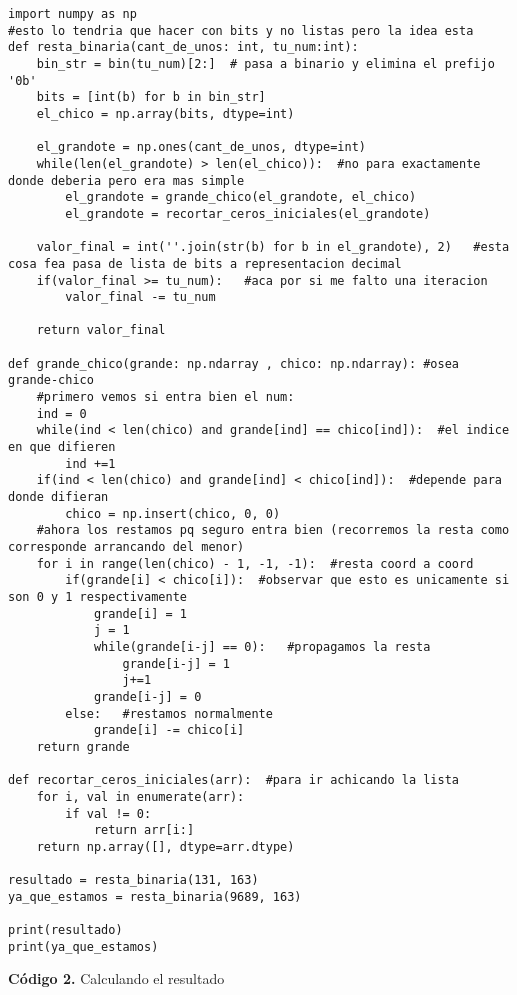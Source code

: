 \documentclass[12pt]{amsart}
\theoremstyle{plain}
\begin{document}
\begin{lstlisting}
import numpy as np
#esto lo tendria que hacer con bits y no listas pero la idea esta
def resta_binaria(cant_de_unos: int, tu_num:int):
    bin_str = bin(tu_num)[2:]  # pasa a binario y elimina el prefijo '0b'
    bits = [int(b) for b in bin_str]
    el_chico = np.array(bits, dtype=int)

    el_grandote = np.ones(cant_de_unos, dtype=int)
    while(len(el_grandote) > len(el_chico)):  #no para exactamente donde deberia pero era mas simple
        el_grandote = grande_chico(el_grandote, el_chico)
        el_grandote = recortar_ceros_iniciales(el_grandote)
        
    valor_final = int(''.join(str(b) for b in el_grandote), 2)   #esta cosa fea pasa de lista de bits a representacion decimal
    if(valor_final >= tu_num):   #aca por si me falto una iteracion
        valor_final -= tu_num
        
    return valor_final

def grande_chico(grande: np.ndarray , chico: np.ndarray): #osea grande-chico
    #primero vemos si entra bien el num:
    ind = 0
    while(ind < len(chico) and grande[ind] == chico[ind]):  #el indice en que difieren
        ind +=1
    if(ind < len(chico) and grande[ind] < chico[ind]):  #depende para donde difieran
        chico = np.insert(chico, 0, 0)
    #ahora los restamos pq seguro entra bien (recorremos la resta como corresponde arrancando del menor)
    for i in range(len(chico) - 1, -1, -1):  #resta coord a coord
        if(grande[i] < chico[i]):  #observar que esto es unicamente si son 0 y 1 respectivamente
            grande[i] = 1
            j = 1
            while(grande[i-j] == 0):   #propagamos la resta
                grande[i-j] = 1
                j+=1
            grande[i-j] = 0
        else:   #restamos normalmente
            grande[i] -= chico[i]
    return grande

def recortar_ceros_iniciales(arr):  #para ir achicando la lista
    for i, val in enumerate(arr):
        if val != 0:
            return arr[i:]
    return np.array([], dtype=arr.dtype)

resultado = resta_binaria(131, 163)
ya_que_estamos = resta_binaria(9689, 163)

print(resultado)
print(ya_que_estamos)   
\end{lstlisting}


\vspace{1em}
\noindent\textbf{Código 2.} Calculando el resultado
\label{codigo2}
\end{document}

